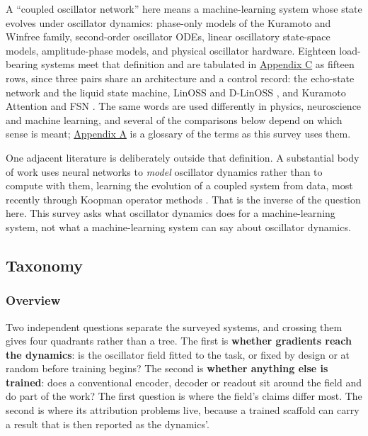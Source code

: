 \documentclass[10pt]{article}
\begin{document}
A ``coupled oscillator network'' here means a machine-learning system
whose state evolves under oscillator dynamics: phase-only models of the
Kuramoto and Winfree family, second-order oscillator ODEs, linear
oscillatory state-space models, amplitude-phase models, and physical
oscillator hardware. Eighteen load-bearing systems meet that definition
and are tabulated in \hyperref[sec-C]{Appendix C} as fifteen rows, since
three pairs share an architecture and a control record: the echo-state
network and the liquid state machine, LinOSS \citep{rusch2025} and
D-LinOSS \citep{d-linoss}, and Kuramoto Attention
\citep{kuramoto-attention} and FSN \citep{nunley2026}. The same words
are used differently in physics, neuroscience and machine learning, and
several of the comparisons below depend on which sense is meant;
\hyperref[sec-A]{Appendix A} is a glossary of the terms as this survey
uses them.

One adjacent literature is deliberately outside that definition. A
substantial body of work uses neural networks to \emph{model} oscillator
dynamics rather than to compute with them, learning the evolution of a
coupled system from data, most recently through Koopman operator methods
\citep{sasikumar2026}. That is the inverse of the question here. This
survey asks what oscillator dynamics does for a machine-learning system,
not what a machine-learning system can say about oscillator dynamics.

\subsection{Taxonomy}\label{sec-2-2}

\subsubsection{Overview}\label{sec-2-2-1}

Two independent questions separate the surveyed systems, and crossing
them gives four quadrants rather than a tree. The first is
\textbf{whether gradients reach the dynamics}: is the oscillator field
fitted to the task, or fixed by design or at random before training
begins? The second is \textbf{whether anything else is trained}: does a
conventional encoder, decoder or readout sit around the field and do
part of the work? The first question is where the field's claims differ
most. The second is where its attribution problems live, because a
trained scaffold can carry a result that is then reported as the
dynamics'.
\end{document}
